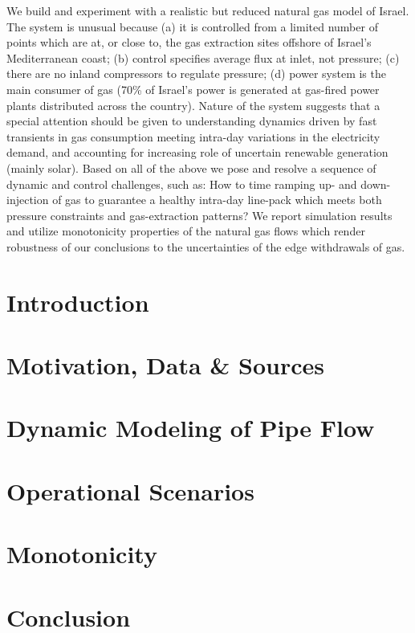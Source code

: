 

    We build and experiment with a realistic but reduced natural gas model of Israel. The system is unusual because (a) it is controlled from a limited number of points which are at, or close to, the gas extraction sites offshore of Israel's Mediterranean coast; (b) control specifies average flux at inlet, not pressure; (c) there are no inland compressors to regulate pressure; (d) power system is the main consumer of gas (70\% of Israel's power is generated at gas-fired power plants distributed across the country). Nature of the system suggests that a special attention should be given to understanding dynamics driven by fast transients in gas consumption meeting intra-day variations in the electricity demand, and accounting for increasing role of uncertain renewable generation (mainly solar). Based on all of the above we pose and resolve a sequence of dynamic and control challenges, such as: How to time ramping up- and down- injection of gas to guarantee a healthy intra-day line-pack which meets both pressure constraints and gas-extraction patterns? We report simulation results and utilize monotonicity properties of the natural gas flows which render robustness of our conclusions to the uncertainties of the edge withdrawals of gas. 

\section{Introduction}


\section{Motivation, Data \& Sources} \label{sec:motivation}


\section{Dynamic Modeling of Pipe Flow}\label{sec:model}


\section{Operational Scenarios} \label{sec:scenarios}


\section{Monotonicity}\label{sec:monotonicty}


\section{Conclusion}\label{sec:conclusion}


